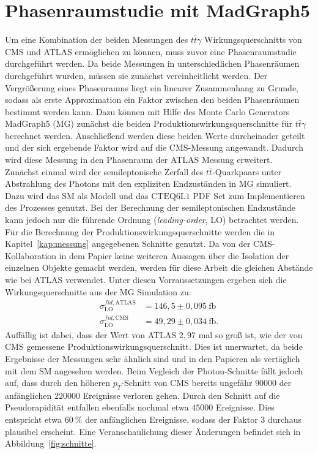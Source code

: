 \section{Phasenraumstudie mit MadGraph5}
\label{phasencms}
Um eine Kombination der beiden Messungen des $t\bar{t}\gamma$ Wirkungsquerschnitts von CMS und ATLAS ermöglichen zu können, muss zuvor eine Phasenraumstudie durchgeführt werden. Da beide Messungen in unterschiedlichen Phasenräumen durchgeführt wurden, müssen sie zunächst vereinheitlicht werden.
Der Vergrößerung eines Phasenraums liegt ein linearer Zusammenhang zu Grunde, sodass als erste Approximation ein Faktor zwischen den beiden Phasenräumen bestimmt werden kann. Dazu können mit Hilfe des Monte Carlo Generators MadGraph5\cite{Alwall:2014hca} (MG) zunächst die beiden Produktionswirkungsquerschnitte für $t\bar{t}\gamma$ berechnet werden.
Anschließend werden diese beiden Werte durcheinader geteilt und der sich ergebende Faktor wird auf die CMS-Messung angewandt. Dadurch wird diese Messung in den Phasenraum der ATLAS Messung erweitert.\\
Zunächst einmal wird der semileptonische Zerfall des $t\bar{t}$-Quarkpaars unter Abstrahlung des Photons mit den expliziten Endzuständen in MG simuliert.
Dazu wird das SM als Modell und das $\text{CTEQ}6\text{L}1$ PDF Set\cite{Paakkinen:2018zbs} zum Implementieren des Prozesses genutzt. Bei der Berechnung der semileptonischen Endzustände kann jedoch nur die führende Ordnung (\textit{leading-order}, LO) betrachtet werden. Für die Berechnung der Produktionswirkungsquerschnitte werden die in Kapitel~\ref{kap:messung} angegebenen Schnitte genutzt.
Da von der CMS-Kollaboration in dem Papier keine weiteren Aussagen über die Isolation der einzelnen Objekte gemacht werden, werden für diese Arbeit die gleichen Abstände wie bei ATLAS verwendet.
Unter diesen Vorraussetzungen ergeben sich die Wirkungsquerschnitte aus der MG Simulation zu:
\begin{align}
  \sigma^{fid, \text{ATLAS}}_{\text{LO}} &= 146,5 \pm 0,095~ \si{\femto\barn}\\
  \sigma^{fid, \text{CMS}}_{\text{LO}} &= 49,29 \pm 0,034~ \si{\femto\barn}.
\end{align}
Auffällig ist dabei, dass der Wert von ATLAS $2,97$ mal so groß ist, wie der von CMS gemessene Produktionswirkungsquerschnitt. Dies ist unerwartet, da beide Ergebnisse der Messungen sehr ähnlich sind und in den Papieren als vertäglich mit dem SM angesehen werden.
Beim Vegleich der Photon-Schnitte fällt jedoch auf, dass durch den höheren $p_T$-Schnitt von CMS bereits ungefähr $90000$ der anfänglichen $220000$ Ereignisse verloren gehen. Durch den Schnitt auf die Pseudorapidität entfallen ebenfalls nochmal etwa $45000$ Ereignisse. Dies entspricht etwa $\SI{60}{\percent}$ der anfänglichen Ereignisse, sodass der Faktor $3$ durchaus plausibel erscheint. Eine Veranschaulichung dieser Änderungen befindet sich in Abbildung~\ref{fig:schnitte}.\\
